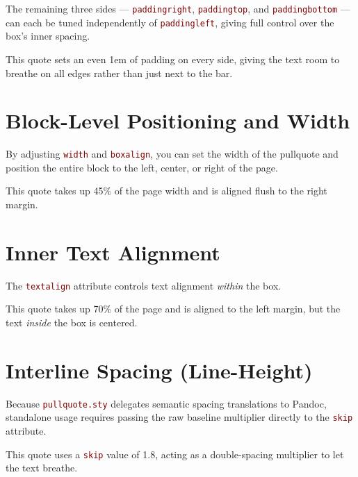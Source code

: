 \documentclass[12pt, a4paper]{article}
\let\oldtexttt\texttt
\renewcommand{\texttt}[1]{\textcolor{Maroon}{\oldtexttt{#1}}}
\begin{document}
The remaining three sides — \texttt{paddingright}, \texttt{paddingtop}, and \texttt{paddingbottom} — can each be tuned independently of \texttt{paddingleft}, giving full control over the box's inner spacing.

\begin{pullquote}[barcolor=SeaGreen, paddingleft=1em, paddingright=1em, paddingtop=1em, paddingbottom=1em]
This quote sets an even 1em of padding on every side, giving the text room to breathe on all edges rather than just next to the bar.
\end{pullquote}

\section*{Block-Level Positioning and Width}

By adjusting \texttt{width} and \texttt{boxalign}, you can set the width of the pullquote and position the entire block to the left, center, or right of the page.

\begin{pullquote}[width=0.45\linewidth, boxalign=right]
This quote takes up 45\% of the page width and is aligned flush to the right margin.
\end{pullquote}

\section*{Inner Text Alignment}

The \texttt{textalign} attribute controls text alignment \emph{within} the box.

\begin{pullquote}[textalign=center, width=0.7\linewidth, boxalign=left]
This quote takes up 70\% of the page and is aligned to the left margin, but the text \emph{inside} the box is centered.
\end{pullquote}

\section*{Interline Spacing (Line-Height)}

Because \texttt{pullquote.sty} delegates semantic spacing translations to Pandoc, standalone usage requires passing the raw baseline multiplier directly to the \texttt{skip} attribute.

\begin{pullquote}[size=xl, skip=1.8]
This quote uses a \texttt{skip} value of 1.8, acting as a double-spacing multiplier to let the text breathe.
\end{pullquote}
\end{document}
